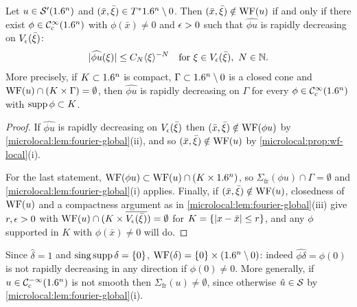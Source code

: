 \begin{proposition}\label{microlocal:prop:fourier-char}
  Let $u\in\mathcal{S}'(1.6^n)$ and $(\bar x,\bar\xi)\in T^*1.6^n\setminus0$. Then
  $(\bar x,\bar\xi)\notin\operatorname{WF}(u)$ if and only if there exist
  $\phi\in\mathcal{C}^\infty_{\mathrm{c}}(1.6^n)$ with $\phi(\bar x)\ne0$ and $\epsilon>0$ such that
  $\widehat{\phi u}$ is rapidly decreasing on $V_\epsilon(\bar\xi)$:
  \begin{equation*}
    \lvert \widehat{\phi u}(\xi)\rvert\le C_N\langle \xi\rangle^{-N}\quad\text{for }
    \xi\in V_\epsilon(\bar\xi),\ N\in\mathbb{N}.
  \end{equation*}
  More precisely, if $K\subset1.6^n$ is compact, $\Gamma\subset1.6^n\setminus0$
  is a closed cone and $\operatorname{WF}(u)\cap(K\times\Gamma)=\emptyset$, then
  $\widehat{\phi u}$ is rapidly decreasing on $\Gamma$ for every
  $\phi\in\mathcal{C}^\infty_{\mathrm{c}}(1.6^n)$ with $\operatorname{supp}\phi\subset K$.
\end{proposition}
\begin{proof}
  If $\widehat{\phi u}$ is rapidly decreasing on $V_\epsilon(\bar\xi)$ then
  $(\bar x,\bar\xi)\notin\operatorname{WF}(\phi u)$ by
  \cref{microlocal:lem:fourier-global}(ii), and so $(\bar
  x,\bar\xi)\notin\operatorname{WF}(u)$ by \cref{microlocal:prop:wf-local}(i).

  For the last statement, $\operatorname{WF}(\phi u)\subset\operatorname{WF}(u)\cap(K\times1.6^n)$, so
  $\Sigma_{\mathrm{fr}}(\phi u)\cap\Gamma=\emptyset$ and
  \cref{microlocal:lem:fourier-global}(i) applies. Finally, if $(\bar
  x,\bar\xi)\notin\operatorname{WF}(u)$, closedness of $\operatorname{WF}(u)$ and a compactness argument
  as in \cref{microlocal:lem:fourier-global}(iii) give $r,\epsilon>0$ with
  $\operatorname{WF}(u)\cap(K\times\overline{V_\epsilon(\bar\xi)})=\emptyset$ for
  $K=\{\lvert x-\bar x\rvert\le r\}$, and any $\phi$ supported in $K$ with
  $\phi(\bar x)\ne0$ will do.
\end{proof}

\begin{example}\label{microlocal:ex:delta}
  Since $\hat\delta=1$ and $\operatorname{sing\,supp}\delta=\{0\}$,
  $\operatorname{WF}(\delta)=\{0\}\times(1.6^n\setminus0)$: indeed
  $\widehat{\phi\delta}=\phi(0)$ is not rapidly decreasing in any direction if
  $\phi(0)\ne0$. More generally, if $u\in\mathcal{C}^{-\infty}_{\mathrm{c}}(1.6^n)$ is not smooth then
  $\Sigma_{\mathrm{fr}}(u)\ne\emptyset$, since otherwise $\hat u\in\mathcal{S}$ by
  \cref{microlocal:lem:fourier-global}(i).
\end{example}

